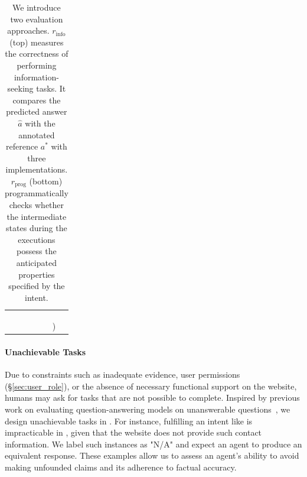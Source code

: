 \documentclass{article}
\begin{document}
\begin{table}[t]
{\begin{tabular}{@{}cccl@{}}
      &  &  &  \\
      & & &  \\
      & & &  \\
      & & &  \\
      \bottomrule
      \end{tabular}%
    }
    \caption{We introduce two evaluation approaches. $r_{\textrm{info}}$ (top) measures the correctness of performing information-seeking tasks. It compares the predicted answer $\hat{a}$ with the annotated reference $a^*$ with three implementations.
    $r_{\textrm{prog}}$ (bottom) programmatically checks whether the intermediate states during the executions possess the anticipated properties specified by the intent. %
    }
    \label{tab:evaluation_examples}
    \vspace{-4mm}
\end{table}

\paragraph{Unachievable Tasks} Due to constraints such as inadequate evidence, user permissions (\S\ref{sec:user_role}), or the absence of necessary functional support on the website, humans may ask for tasks that are not possible to complete.
Inspired by previous work on evaluating question-answering models on unanswerable questions~\citep{rajpurkar2018know}, we design unachievable tasks in \ours. 
For instance, fulfilling an intent like  is impracticable in \ours, given that the website does not provide such contact information. 
We label such instances as "N/A" and expect an agent to produce an equivalent response. 
These examples allow us to assess an agent's ability to avoid making unfounded claims and its adherence to factual accuracy.
\end{document}
